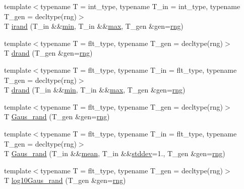 \begin{DoxyCompactItemize}
\item 
{\footnotesize template$<$typename T  = int\-\_\-type, typename T\-\_\-in  = int\-\_\-type, typename T\-\_\-gen  = decltype(rng)$>$ }\\T \hyperlink{namespaceIceBRG_ab6adcd84220e59c9d57ea09c717e0632}{irand} (T\-\_\-in \&\&\hyperlink{namespaceIceBRG_ad79c6bf9877e0d543cf61a479754e4b6}{min}, T\-\_\-in \&\&\hyperlink{namespaceIceBRG_a095a1ee68bf6116d22d2e23a2b8bfb9d}{max}, T\-\_\-gen \&gen=\hyperlink{namespaceIceBRG_a43349d2fe56e49b46f2da45c2472137d}{rng})
\item 
{\footnotesize template$<$typename T  = flt\-\_\-type, typename T\-\_\-gen  = decltype(rng)$>$ }\\T \hyperlink{namespaceIceBRG_a3dc62dbc81a4973ecc1038db665b07f0}{drand} (T\-\_\-gen \&gen=\hyperlink{namespaceIceBRG_a43349d2fe56e49b46f2da45c2472137d}{rng})
\item 
{\footnotesize template$<$typename T  = flt\-\_\-type, typename T\-\_\-in  = flt\-\_\-type, typename T\-\_\-gen  = decltype(rng)$>$ }\\T \hyperlink{namespaceIceBRG_a78b425be2a3d71234c706b330b71acbc}{drand} (T\-\_\-in \&\&\hyperlink{namespaceIceBRG_ad79c6bf9877e0d543cf61a479754e4b6}{min}, T\-\_\-in \&\&\hyperlink{namespaceIceBRG_a095a1ee68bf6116d22d2e23a2b8bfb9d}{max}, T\-\_\-gen \&gen=\hyperlink{namespaceIceBRG_a43349d2fe56e49b46f2da45c2472137d}{rng})
\item 
{\footnotesize template$<$typename T  = flt\-\_\-type, typename T\-\_\-gen  = decltype(rng)$>$ }\\T \hyperlink{namespaceIceBRG_ab4693120c7a7cdf4e14f7524ab723ec0}{Gaus\-\_\-rand} (T\-\_\-gen \&gen=\hyperlink{namespaceIceBRG_a43349d2fe56e49b46f2da45c2472137d}{rng})
\item 
{\footnotesize template$<$typename T  = flt\-\_\-type, typename T\-\_\-in  = flt\-\_\-type, typename T\-\_\-gen  = decltype(rng)$>$ }\\T \hyperlink{namespaceIceBRG_a1e02559a05bc53757d08f048a3fb018f}{Gaus\-\_\-rand} (T\-\_\-in \&\&\hyperlink{namespaceIceBRG_a31912d66a78938bcc3e0fdbc917c5eec}{mean}, T\-\_\-in \&\&\hyperlink{namespaceIceBRG_a9db49a32658ae04d4e5780e90c58ae15}{stddev}=1., T\-\_\-gen \&gen=\hyperlink{namespaceIceBRG_a43349d2fe56e49b46f2da45c2472137d}{rng})
\item 
{\footnotesize template$<$typename T  = flt\-\_\-type, typename T\-\_\-gen  = decltype(rng)$>$ }\\T \hyperlink{namespaceIceBRG_a855ebb82510a9cbbec19be3ce5b160c0}{log10\-Gaus\-\_\-rand} (T\-\_\-gen \&gen=\hyperlink{namespaceIceBRG_a43349d2fe56e49b46f2da45c2472137d}{rng})

\end{DoxyCompactItemize}
